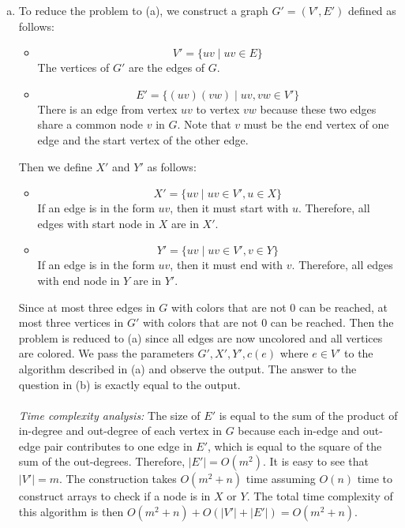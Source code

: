 \documentclass[11pt]{article}
\begin{document}
\begin{solution}
\begin{enumerate}[(a)]
\item To reduce the problem to (a), we construct a graph $G'=(V', E')$ defined as follows:
\begin{itemize}
\item
$$V'=\{uv\mid uv\in E\}$$
The vertices of $G'$ are the edges of $G$.
\item
$$E'=\{(uv)(vw)\mid uv,vw\in V'\}$$
There is an edge from vertex $uv$ to vertex $vw$ because these two edges share a common node $v$ in $G$. Note that $v$ must be the end vertex of one edge and the start vertex of the other edge.
\end{itemize}
Then we define $X'$ and $Y'$ as follows:
\begin{itemize}
\item
$$X'=\{uv\mid uv\in V', u\in X\}$$
If an edge is in the form $uv$, then it must start with $u$. Therefore, all edges with start node in $X$ are in $X'$.
\item
$$Y'=\{uv\mid uv\in V', v\in Y\}$$
If an edge is in the form $uv$, then it must end with $v$. Therefore, all edges with end node in $Y$ are in $Y'$.
\end{itemize}
Since at most three edges in $G$ with colors that are not $0$ can be reached, at most three vertices in $G'$ with colors that are not $0$ can be reached. Then the problem is reduced to (a) since all edges are now uncolored and all vertices are colored. We pass the parameters $G', X', Y', c(e)$ where $e\in V'$ to the algorithm described in (a) and observe the output. The answer to the question in (b) is exactly equal to the output.\\\\
\emph{Time complexity analysis: }The size of $E'$ is equal to the sum of the product of in-degree and out-degree of each vertex in $G$ because each in-edge and out-edge pair contributes to one edge in $E'$, which is equal to the square of the sum of the out-degrees. Therefore, $|E'|=O(m^2)$. It is easy to see that $|V'|=m$. The construction takes $O(m^2+n)$ time assuming $O(n)$ time to construct arrays to check if a node is in $X$ or $Y$. The total time complexity of this algorithm is then $O(m^2+n)+O(|V'|+|E'|)=O(m^2+n)$.
\end{enumerate}
\end{solution}

\end{document}
